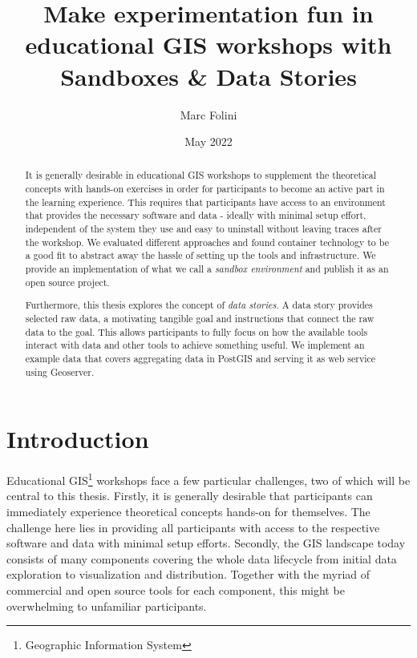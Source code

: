 \documentclass[11pt, a4paper, oneside, parskip=full-]{scrartcl}
\title{Make experimentation fun in educational GIS workshops with Sandboxes \& Data Stories}
\author{Marc Folini}
\date{May 2022}
\begin{document}
\begin{titlepage}
  \setcounter{page}{1}
  \clearpage\maketitle
  \thispagestyle{empty}
  \begin{abstract}
    It is generally desirable in educational GIS workshops to supplement the
    theoretical concepts with hands-on exercises in order for participants to
    become an active part in the learning experience. This requires that
    participants have access to an environment that provides the necessary
    software and data - ideally with minimal setup effort, independent of the
    system they use and easy to uninstall without leaving traces after the
    workshop. We evaluated different approaches and found container technology
    to be a good fit to abstract away the hassle of setting up the tools and
    infrastructure. We provide an implementation of what we call a \emph{sandbox
    environment} and publish it as an open source project.

    Furthermore, this thesis explores the concept of \emph{data stories}. A data
    story provides selected raw data, a motivating tangible goal and
    instructions that connect the raw data to the goal. This allows participants
    to fully focus on how the available tools interact with data and other tools
    to achieve something useful. We implement an example data that covers
    aggregating data in PostGIS and serving it as web service using Geoserver.
  \end{abstract}
\end{titlepage}

\newpage
\tableofcontents

\newpage
{}
\setcounter{page}{1}
\section{Introduction}
Educational GIS\footnote{Geographic Information System} workshops face a few
particular challenges, two of which will be central to this thesis. Firstly, it
is generally desirable that participants can immediately experience theoretical
concepts hands-on for themselves. The challenge here lies in providing all
participants with access to the respective software and data with minimal setup
efforts. Secondly, the GIS landscape today consists of many components covering
the whole data lifecycle from initial data exploration to visualization and
distribution. Together with the myriad of commercial and open source tools for
each component, this might be overwhelming to unfamiliar participants.
\end{document}
